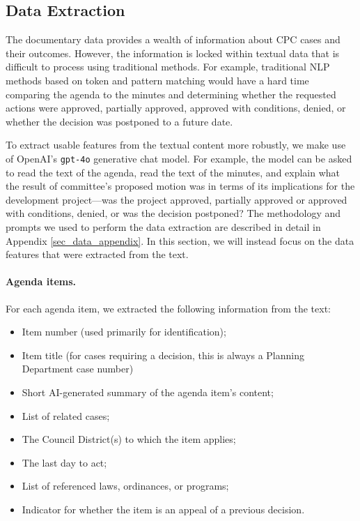 \subsection{Data Extraction}

The documentary data provides a wealth of information about CPC cases and their outcomes. However, the information is locked within textual data that is difficult to process using traditional methods. For example, traditional NLP methods based on token and pattern matching would have a hard time comparing the agenda to the minutes and determining whether the requested actions were approved, partially approved, approved with conditions, denied, or whether the decision was postponed to a future date. 

To extract usable features from the textual content more robustly, we make use of OpenAI's \texttt{gpt-4o} generative chat model. For example, the model can be asked to read the text of the agenda, read the text of the minutes, and explain what the result of committee's proposed motion was in terms of its implications for the development project---was the project approved, partially approved or approved with conditions, denied, or was the decision postponed? The methodology and prompts we used to perform the data extraction are described in detail in Appendix \ref{sec_data_appendix}. In this section, we will instead focus on the data features that were extracted from the text.

\paragraph{Agenda items.} For each agenda item, we extracted the following information from the text: 
\begin{itemize}[noitemsep, topsep=0pt]
\item Item number (used primarily for identification);
\item Item title (for cases requiring a decision, this is always a Planning Department case number)
\item Short AI-generated summary of the agenda item's content;
\item List of related cases;
\item The Council District(s) to which the item applies;
\item The last day to act;
\item List of referenced laws, ordinances, or programs;
\item Indicator for whether the item is an appeal of a previous decision.
\end{itemize}

